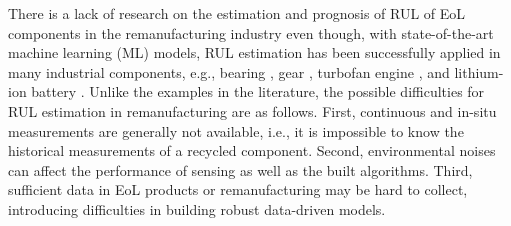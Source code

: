 
There is a lack of research on the estimation and prognosis of RUL of EoL components in the remanufacturing industry even though, with state-of-the-art machine learning (ML) models, RUL estimation has been successfully applied in many industrial components, e.g., bearing \cite{rul-nn-bearing-BENALI2015150, rul-cnn-bearing-LI20181, rul-ensemble-bearing}, gear \cite{rul-review-gear}, turbofan engine \cite{rul-statespace-turbo-battery-Mosallam2016,rul-cnn-turbo-LI20181,rul-rnn-turbo-WU2020241}, and lithium-ion battery \cite{rul-statespace-turbo-battery-Mosallam2016,rul-review-battery-LIPU2018115,rul-gpr-battery-9040661}. Unlike the examples in the literature, the possible difficulties for RUL estimation in remanufacturing are as follows. First, continuous and in-situ measurements are generally not available, i.e., it is impossible to know the historical measurements of a recycled component. Second,
environmental noises can affect the performance of sensing as well as the built algorithms. Third, sufficient data in EoL products or remanufacturing may be hard to collect, introducing difficulties in building robust data-driven models.

